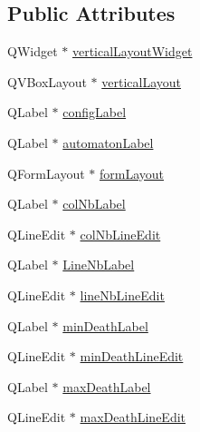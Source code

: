 \subsection*{Public Attributes}
\begin{DoxyCompactItemize}
\item 
Q\+Widget $\ast$ \mbox{\hyperlink{class_ui___config_game_of_life_automaton_window_a230759c7492f71053f13caaffad25c46}{vertical\+Layout\+Widget}}
\item 
Q\+V\+Box\+Layout $\ast$ \mbox{\hyperlink{class_ui___config_game_of_life_automaton_window_adee2b219cb745d11a73f8bdcfb4adf77}{vertical\+Layout}}
\item 
Q\+Label $\ast$ \mbox{\hyperlink{class_ui___config_game_of_life_automaton_window_ada7dd5424e0cfec7bc383b8bbb336eb5}{config\+Label}}
\item 
Q\+Label $\ast$ \mbox{\hyperlink{class_ui___config_game_of_life_automaton_window_ad533981350ecbd1d00d17682a5fe4391}{automaton\+Label}}
\item 
Q\+Form\+Layout $\ast$ \mbox{\hyperlink{class_ui___config_game_of_life_automaton_window_a1d7a9946fc2d8a0861d052081e574501}{form\+Layout}}
\item 
Q\+Label $\ast$ \mbox{\hyperlink{class_ui___config_game_of_life_automaton_window_a26d48d59decd7a801c3dfe7f3e3f13ab}{col\+Nb\+Label}}
\item 
Q\+Line\+Edit $\ast$ \mbox{\hyperlink{class_ui___config_game_of_life_automaton_window_af96df0d9d9ec680dc1e16d491a65835d}{col\+Nb\+Line\+Edit}}
\item 
Q\+Label $\ast$ \mbox{\hyperlink{class_ui___config_game_of_life_automaton_window_a63cbcbdccfdd9067dfc2cdd39ca49f03}{Line\+Nb\+Label}}
\item 
Q\+Line\+Edit $\ast$ \mbox{\hyperlink{class_ui___config_game_of_life_automaton_window_a41d6c05a159c9504e325f8147963ec54}{line\+Nb\+Line\+Edit}}
\item 
Q\+Label $\ast$ \mbox{\hyperlink{class_ui___config_game_of_life_automaton_window_a705e3c83698f4c9990f4702fb3d1975e}{min\+Death\+Label}}
\item 
Q\+Line\+Edit $\ast$ \mbox{\hyperlink{class_ui___config_game_of_life_automaton_window_a8864be23bc90229783159cd98ed81d86}{min\+Death\+Line\+Edit}}
\item 
Q\+Label $\ast$ \mbox{\hyperlink{class_ui___config_game_of_life_automaton_window_a438df193b6efc6ea87eb02dff06350d6}{max\+Death\+Label}}
\item 
Q\+Line\+Edit $\ast$ \mbox{\hyperlink{class_ui___config_game_of_life_automaton_window_a40f15f0b7256ecac5578101406ad8f12}{max\+Death\+Line\+Edit}}

\end{DoxyCompactItemize}
